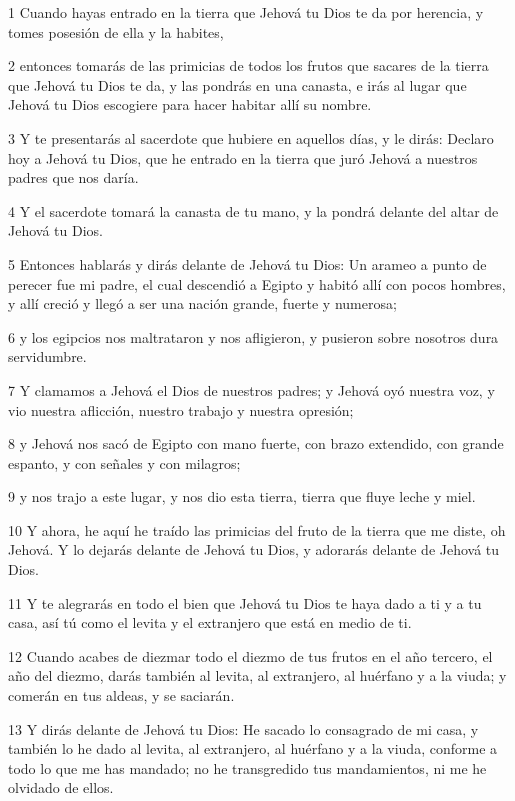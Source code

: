\par 1 Cuando hayas entrado en la tierra que Jehová tu Dios te da por herencia, y tomes posesión de ella y la habites,
\par 2 entonces tomarás de las primicias de todos los frutos que sacares de la tierra que Jehová tu Dios te da, y las pondrás en una canasta, e irás al lugar que Jehová tu Dios escogiere para hacer habitar allí su nombre.
\par 3 Y te presentarás al sacerdote que hubiere en aquellos días, y le dirás: Declaro hoy a Jehová tu Dios, que he entrado en la tierra que juró Jehová a nuestros padres que nos daría.
\par 4 Y el sacerdote tomará la canasta de tu mano, y la pondrá delante del altar de Jehová tu Dios.
\par 5 Entonces hablarás y dirás delante de Jehová tu Dios: Un arameo a punto de perecer fue mi padre, el cual descendió a Egipto y habitó allí con pocos hombres, y allí creció y llegó a ser una nación grande, fuerte y numerosa;
\par 6 y los egipcios nos maltrataron y nos afligieron, y pusieron sobre nosotros dura servidumbre.
\par 7 Y clamamos a Jehová el Dios de nuestros padres; y Jehová oyó nuestra voz, y vio nuestra aflicción, nuestro trabajo y nuestra opresión;
\par 8 y Jehová nos sacó de Egipto con mano fuerte, con brazo extendido, con grande espanto, y con señales y con milagros;
\par 9 y nos trajo a este lugar, y nos dio esta tierra, tierra que fluye leche y miel.
\par 10 Y ahora, he aquí he traído las primicias del fruto de la tierra que me diste, oh Jehová. Y lo dejarás delante de Jehová tu Dios, y adorarás delante de Jehová tu Dios.
\par 11 Y te alegrarás en todo el bien que Jehová tu Dios te haya dado a ti y a tu casa, así tú como el levita y el extranjero que está en medio de ti.
\par 12 Cuando acabes de diezmar todo el diezmo de tus frutos en el año tercero, el año del diezmo, darás también al levita, al extranjero, al huérfano y a la viuda; y comerán en tus aldeas, y se saciarán. 
\par 13 Y dirás delante de Jehová tu Dios: He sacado lo consagrado de mi casa, y también lo he dado al levita, al extranjero, al huérfano y a la viuda, conforme a todo lo que me has mandado; no he transgredido tus mandamientos, ni me he olvidado de ellos.
